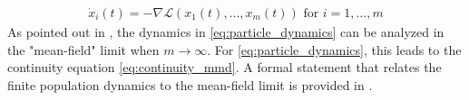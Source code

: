 \begin{align}\label{eq:particle_dynamics}
	\dot{x}_i(t)= -\nabla \mathcal{L}(x_1(t),...,x_m(t)) \text{ for } i=1, \dots, m
\end{align}  
As pointed out in \cite{chizat2018global,Rotskoff:2019}, the dynamics in \cref{eq:particle_dynamics} can be analyzed in the "mean-field" limit when $m\rightarrow \infty$. For \cref{eq:particle_dynamics}, this leads to the continuity equation \cref{eq:continuity_mmd}. A formal statement that relates the finite population dynamics to the mean-field limit is provided in . 


%

